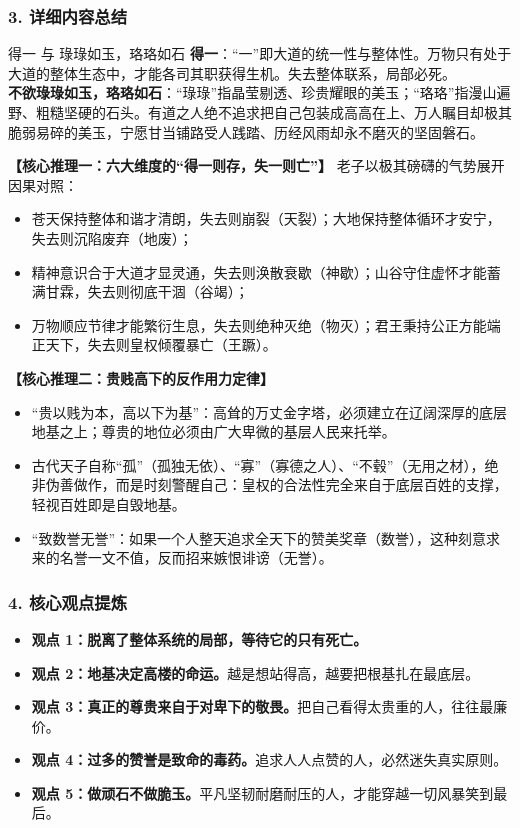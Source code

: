 \subsubsection{3. 详细内容总结}

\begin{ConceptBox}{得一 与 琭琭如玉，珞珞如石}
\textbf{得一}：“一”即大道的统一性与整体性。万物只有处于大道的整体生态中，才能各司其职获得生机。失去整体联系，局部必死。\\
\textbf{不欲琭琭如玉，珞珞如石}：“琭琭”指晶莹剔透、珍贵耀眼的美玉；“珞珞”指漫山遍野、粗糙坚硬的石头。有道之人绝不追求把自己包装成高高在上、万人瞩目却极其脆弱易碎的美玉，宁愿甘当铺路受人践踏、历经风雨却永不磨灭的坚固磐石。
\end{ConceptBox}

\noindent\textbf{【核心推理一：六大维度的“得一则存，失一则亡”】}
老子以极其磅礴的气势展开因果对照：
\begin{itemize}
    \item 苍天保持整体和谐才清朗，失去则崩裂（天裂）；大地保持整体循环才安宁，失去则沉陷废弃（地废）；
    \item 精神意识合于大道才显灵通，失去则涣散衰歇（神歇）；山谷守住虚怀才能蓄满甘霖，失去则彻底干涸（谷竭）；
    \item 万物顺应节律才能繁衍生息，失去则绝种灭绝（物灭）；君王秉持公正方能端正天下，失去则皇权倾覆暴亡（王蹶）。
\end{itemize}

\noindent\textbf{【核心推理二：贵贱高下的反作用力定律】}
\begin{itemize}
    \item “贵以贱为本，高以下为基”：高耸的万丈金字塔，必须建立在辽阔深厚的底层地基之上；尊贵的地位必须由广大卑微的基层人民来托举。
    \item 古代天子自称“孤”（孤独无依）、“寡”（寡德之人）、“不毂”（无用之材），绝非伪善做作，而是时刻警醒自己：皇权的合法性完全来自于底层百姓的支撑，轻视百姓即是自毁地基。
    \item “致数誉无誉”：如果一个人整天追求全天下的赞美奖章（数誉），这种刻意求来的名誉一文不值，反而招来嫉恨诽谤（无誉）。
\end{itemize}

\subsubsection{4. 核心观点提炼}
\begin{itemize}
    \item \textbf{观点 1：脱离了整体系统的局部，等待它的只有死亡。}
    \item \textbf{观点 2：地基决定高楼的命运。}越是想站得高，越要把根基扎在最底层。
    \item \textbf{观点 3：真正的尊贵来自于对卑下的敬畏。}把自己看得太贵重的人，往往最廉价。
    \item \textbf{观点 4：过多的赞誉是致命的毒药。}追求人人点赞的人，必然迷失真实原则。
    \item \textbf{观点 5：做顽石不做脆玉。}平凡坚韧耐磨耐压的人，才能穿越一切风暴笑到最后。
\end{itemize}

